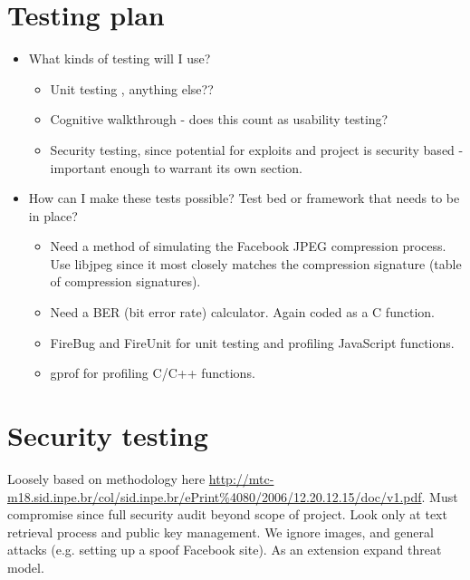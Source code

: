 \section{Testing plan}
    \begin{itemize}
	\item What kinds of testing will I use?
        \begin{itemize}
            \item Unit testing , anything else??
            \item Cognitive walkthrough - does this count as usability testing?
            \item Security testing, since potential for exploits and project is security based - important enough to warrant its own section.
        \end{itemize}
	\item How can I make these tests possible? Test bed or framework that needs to be in place?
        \begin{itemize}
            \item Need a method of simulating the Facebook JPEG compression process. Use libjpeg since it most closely matches the compression signature (table of compression signatures).
            \item Need a BER (bit error rate) calculator. Again coded as a C function.
            \item FireBug and FireUnit for unit testing and profiling JavaScript functions.
            \item gprof for profiling C/C++ functions.
        \end{itemize}
    \end{itemize}

\section{Security testing}

Loosely based on methodology here \url{http://mtc-m18.sid.inpe.br/col/sid.inpe.br/ePrint\%4080/2006/12.20.12.15/doc/v1.pdf}. Must compromise since full security audit beyond scope of project. Look only at text retrieval process and public key management. We ignore images, and general attacks (e.g. setting up a spoof Facebook site). As an extension expand threat model.

